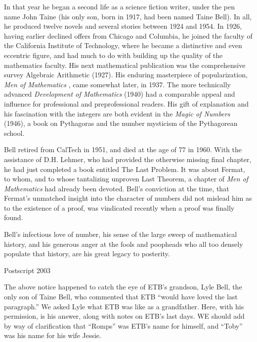 \documentclass[10pt,letter]{article}
\begin{document}
In that year he began a second life as a science fiction writer, under
the pen name John Taine (his only son, born in 1917, had been named
Taine Bell). In all, he produced twelve novels and several stories
between 1924 and 1954. In 1926, having earlier declined offers from
Chicago and Columbia, he joined the faculty of the California Institute
of Technology, where he became a distinctive and even eccentric figure,
and had much to do with building up the quality of the mathematics
faculty. His next mathematical publication was the comprehensive survey
Algebraic Arithmetic (1927). His enduring masterpiece of popularization,
\emph{Men of Mathematics} , came somewhat later, in 1937. The more
technically advanced \emph{Development of Mathematics} (1940) had a
comparable appeal and influence for professional and preprofessional
readers. His gift of explanation and his fascination with the integers
are both evident in the \emph{Magic of Numbers} (1946), a book on
Pythagoras and the number mysticism of the Pythagorean school.

Bell retired from CalTech in 1951, and died at the age of 77 in 1960.
With the assistance of D.H. Lehmer, who had provided the otherwise
missing final chapter, he had just completed a book entitled The Last
Problem. It was about Fermat, to whom, and to whose tantalizing unproven
Last Theorem, a chapter of \emph{Men of Mathematics} had already been
devoted. Bell's conviction at the time, that Fermat's unmatched insight
into the character of numbers did not mislead him as to the existence of
a proof, was vindicated recently when a proof was finally found.

Bell's infectious love of number, his sense of the large sweep of
mathematical history, and his generous anger at the fools and poopheads
who all too densely populate that history, are his great legacy to
posterity.

Postscript 2003

The above notice happened to catch the eye of ETB's grandson, Lyle Bell,
the only son of Taine Bell, who commented that ETB ``would have loved
the last paragraph.'' We asked Lyle what ETB was like as a grandfather.
Here, with his permission, is his answer, along with notes on ETB's last
days. WE should add by way of clarification that ``Romps'' was ETB's
name for himself, and ``Toby'' was his name for his wife Jessie.
\end{document}
